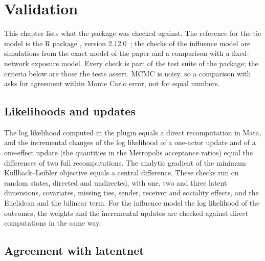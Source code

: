 \chapter{Validation}\label{ch:validation}

This chapter lists what the package was checked against. The reference for the tie model is the R package \latentnet{}, version 2.12.0~\cite{latentnetpkg}; the checks of the influence model are simulations from the exact model of the paper and a comparison with a fixed-network exposure model. Every check is part of the test suite of the package; the criteria below are those the tests assert. MCMC is noisy, so a comparison with \latentnet{} asks for agreement within Monte Carlo error, not for equal numbers.

\section{Likelihoods and updates}

The log likelihood computed in the plugin equals a direct recomputation in Mata, and the incremental changes of the log likelihood of a one-actor update and of a one-effect update (the quantities in the Metropolis acceptance ratios) equal the differences of two full recomputations. The analytic gradient of the minimum Kullback--Leibler objective equals a central difference. These checks run on random states, directed and undirected, with one, two and three latent dimensions, covariates, missing ties, sender, receiver and sociality effects, and the Euclidean and the bilinear term. For the influence model the log likelihood of the outcomes, the weights and the incremental updates are checked against direct computations in the same way.

\section{Agreement with latentnet}


